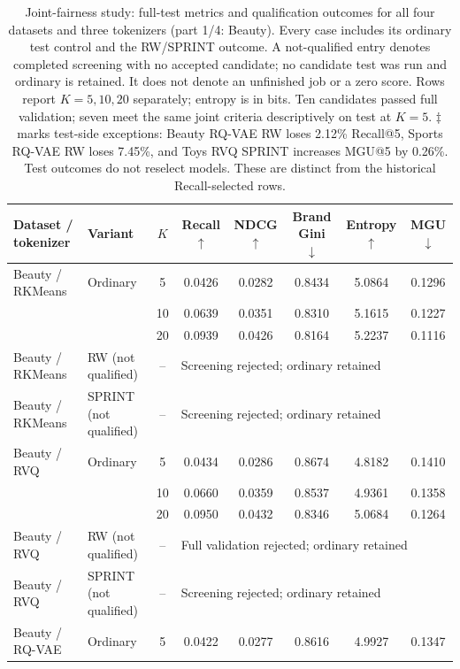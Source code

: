 \begin{table}[p]
\centering\small
\setlength{\tabcolsep}{3pt}
\caption{Joint-fairness study: full-test metrics and qualification outcomes for all four datasets and three tokenizers (part 1/4: Beauty). Every case includes its ordinary test control and the RW/SPRINT outcome. A not-qualified entry denotes completed screening with no accepted candidate; no candidate test was run and ordinary is retained. It does not denote an unfinished job or a zero score. Rows report $K=5,10,20$ separately; entropy is in bits. Ten candidates passed full validation; seven meet the same joint criteria descriptively on test at $K=5$. $\ddagger$ marks test-side exceptions: Beauty RQ-VAE RW loses 2.12\% Recall@5, Sports RQ-VAE RW loses 7.45\%, and Toys RVQ SPRINT increases MGU@5 by 0.26\%. Test outcomes do not reselect models. These are distinct from the historical Recall-selected rows.}
\label{tab:joint-fairness-tests}
\label{tab:joint-fairness-tests-beauty}
\begin{tabular}{llcccccc}
\toprule
Dataset / tokenizer & Variant & $K$ & Recall $\uparrow$ & NDCG $\uparrow$ & Brand Gini $\downarrow$ & Entropy $\uparrow$ & MGU $\downarrow$ \\
\midrule
Beauty / RKMeans & Ordinary & 5 & 0.0426 & 0.0282 & 0.8434 & 5.0864 & 0.1296 \\
 &  & 10 & 0.0639 & 0.0351 & 0.8310 & 5.1615 & 0.1227 \\
 &  & 20 & 0.0939 & 0.0426 & 0.8164 & 5.2237 & 0.1116 \\
Beauty / RKMeans & RW (not qualified) & -- & \multicolumn{5}{l}{Screening rejected; ordinary retained} \\
Beauty / RKMeans & SPRINT (not qualified) & -- & \multicolumn{5}{l}{Screening rejected; ordinary retained} \\
\midrule
Beauty / RVQ & Ordinary & 5 & 0.0434 & 0.0286 & 0.8674 & 4.8182 & 0.1410 \\
 &  & 10 & 0.0660 & 0.0359 & 0.8537 & 4.9361 & 0.1358 \\
 &  & 20 & 0.0950 & 0.0432 & 0.8346 & 5.0684 & 0.1264 \\
Beauty / RVQ & RW (not qualified) & -- & \multicolumn{5}{l}{Full validation rejected; ordinary retained} \\
Beauty / RVQ & SPRINT (not qualified) & -- & \multicolumn{5}{l}{Screening rejected; ordinary retained} \\
\midrule
Beauty / RQ-VAE & Ordinary & 5 & 0.0422 & 0.0277 & 0.8616 & 4.9927 & 0.1347 \\

\end{tabular}
\end{table}
